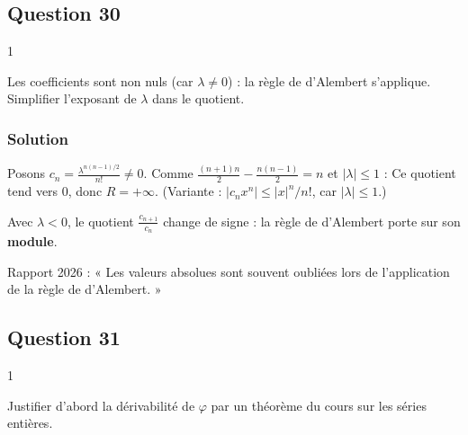 \documentclass[11pt,a4paper]{article}
\newcommand{\equationajustee}[1]{%
  \sbox{\boiteequation}{$\displaystyle #1$}%
  \ifdim\wd\boiteequation>\linewidth
    \[\resizebox{\linewidth}{!}{\usebox{\boiteequation}}\]%
  \else
    \[#1\]%
  \fi}
\begin{document}
\hypertarget{question-30}{%
\subsection{Question 30}\label{question-30}}

\begin{indication}{1}

Les coefficients sont non nuls (car \(\lambda\ne0\)) : la règle de d'Alembert s'applique. Simplifier l'exposant de \(\lambda\) dans le quotient.

\end{indication}

\hypertarget{solution-29}{%
\subsubsection{Solution}\label{solution-29}}

Posons \(c_n=\frac{\lambda^{n(n-1)/2}}{n!}\ne0\). Comme \(\frac{(n+1)n}2-\frac{n(n-1)}2=n\) et \(|\lambda|\le1\) :
\equationajustee{\begin{aligned}
\left|\frac{c_{n+1}}{c_n}\right|&=\frac{|\lambda|^n}{n+1}\\
&\le\frac1{n+1}.
\end{aligned}}
Ce quotient tend vers \(0\), donc \(\boxed{R=+\infty}\). (Variante : \(|c_nx^n|\le|x|^n/n!\), car \(|\lambda|\le1\).)

\begin{piege}

Avec \(\lambda<0\), le quotient \(\frac{c_{n+1}}{c_n}\) change de signe : la règle de d'Alembert porte sur son \textbf{module}.

\end{piege}

\begin{jury}

Rapport 2026 : « Les valeurs absolues sont souvent oubliées lors de l'application de la règle de d'Alembert. »

\end{jury}

\hypertarget{question-31}{%
\subsection{Question 31}\label{question-31}}

\begin{indication}{1}

Justifier d'abord la dérivabilité de \(\varphi\) par un théorème du cours sur les séries entières.

\end{indication}
\end{document}
